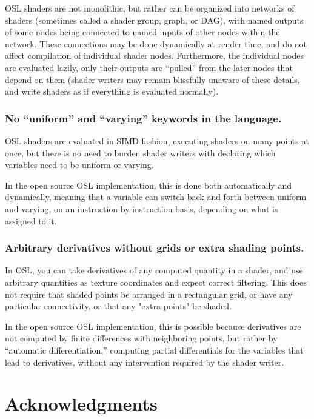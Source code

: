 \documentclass[11pt,letterpaper]{book}
\begin{document}
  OSL shaders are not monolithic, but rather can be organized into
  networks of shaders (sometimes called a shader group, graph, or DAG),
  with named outputs of some nodes being connected to named inputs of
  other nodes within the network.  These connections may be done
  dynamically at render time, and do not affect compilation of
  individual shader nodes.  Furthermore, the individual nodes are
  evaluated lazily, only their outputs are ``pulled'' from the later nodes
  that depend on them (shader writers may remain blissfully unaware of
  these details, and write shaders as if everything is evaluated
  normally).

\subsubsection*{No ``uniform'' and ``varying'' keywords in the language.}

  OSL shaders are evaluated in SIMD fashion, executing shaders on many
  points at once, but there is no need to burden shader writers with
  declaring which variables need to be uniform or varying.  

  In the open source OSL implementation, this is done both automatically
  and dynamically, meaning that a variable can switch back and forth
  between uniform and varying, on an instruction-by-instruction basis,
  depending on what is assigned to it.

\subsubsection*{Arbitrary derivatives without grids or extra shading points.}

  In OSL, you can take derivatives of any computed quantity in a shader,
  and use arbitrary quantities as texture coordinates and expect correct
  filtering.  This does not require that shaded points be arranged in a
  rectangular grid, or have any particular connectivity, or that any
  "extra points" be shaded.  

  In the open source OSL implementation, this is possible because
  derivatives are not computed by finite differences with neighboring
  points, but rather by ``automatic differentiation,'' computing partial
  differentials for the variables that lead to derivatives, without any
  intervention required by the shader writer.


\vspace{0.5in}


\section*{Acknowledgments}
\end{document}
